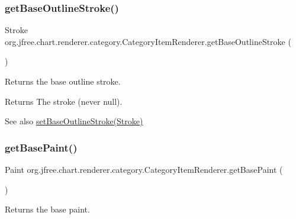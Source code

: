 \subsubsection{\texorpdfstring{get\+Base\+Outline\+Stroke()}{getBaseOutlineStroke()}}
{\footnotesize\ttfamily Stroke org.\+jfree.\+chart.\+renderer.\+category.\+Category\+Item\+Renderer.\+get\+Base\+Outline\+Stroke (\begin{DoxyParamCaption}{ }\end{DoxyParamCaption})}

Returns the base outline stroke.

\begin{DoxyReturn}{Returns}
The stroke (never {\ttfamily null}).
\end{DoxyReturn}
\begin{DoxySeeAlso}{See also}
\mbox{\hyperlink{interfaceorg_1_1jfree_1_1chart_1_1renderer_1_1category_1_1_category_item_renderer_a3440b96cffb9e0312622dc733fb18f73}{set\+Base\+Outline\+Stroke(\+Stroke)}} 
\end{DoxySeeAlso}
\mbox{\label{interfaceorg_1_1jfree_1_1chart_1_1renderer_1_1category_1_1_category_item_renderer_a4ec9128f95f8accf841ecf3d804bc04f}} 
\subsubsection{\texorpdfstring{get\+Base\+Paint()}{getBasePaint()}}
{\footnotesize\ttfamily Paint org.\+jfree.\+chart.\+renderer.\+category.\+Category\+Item\+Renderer.\+get\+Base\+Paint (\begin{DoxyParamCaption}{ }\end{DoxyParamCaption})}

Returns the base paint.

